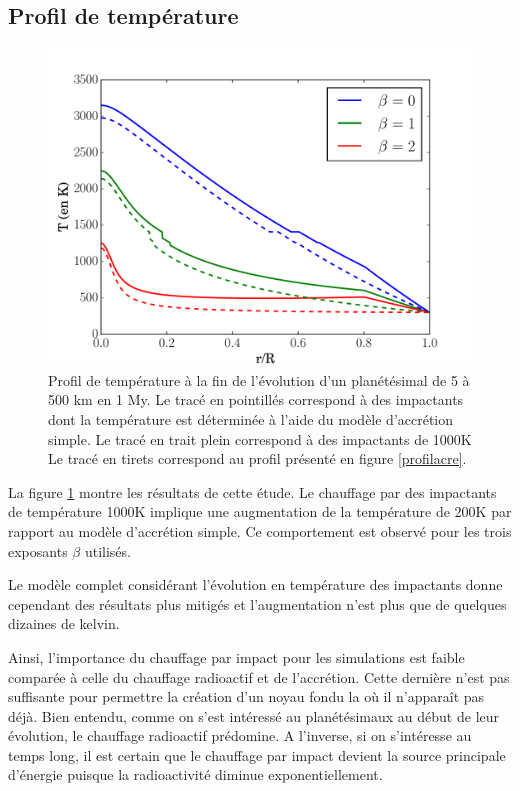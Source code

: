 \documentclass[10pt,a4paper]{article}
\numberwithin{equation}{section}
\begin{document}
\label{impactant}
\subsection{Profil de température}

\begin{figure}[h]
    \centering	    
	\includegraphics[scale=0.45]{figures/profil_acre_impact.pdf}
    \caption{Profil de température à la fin de l'évolution d'un planétésimal de 5 à 500 km en 1 My. Le tracé en pointillés correspond à des impactants dont la température est déterminée à l'aide du modèle d'accrétion simple. Le tracé en trait plein correspond à des impactants de 1000K Le tracé en tirets correspond au profil présenté en figure \ref{profilacre}.}
    	\label{impact} 
\end{figure}

La figure \ref{impact} montre les résultats de cette étude. Le chauffage par des impactants de température 1000K implique une augmentation de la température de 200K par rapport au modèle d'accrétion simple. Ce comportement est observé pour les trois exposants $\beta$ utilisés.
\medskip

Le modèle complet considérant l'évolution en température des impactants donne cependant des résultats plus mitigés et l'augmentation n'est plus que de quelques dizaines de kelvin.
\medskip

Ainsi, l'importance du chauffage par impact pour les simulations est faible comparée à celle du chauffage radioactif et de l'accrétion. Cette dernière n'est pas suffisante pour permettre la création d'un noyau fondu la où il n'apparaît pas déjà. Bien entendu, comme on s'est intéressé au planétésimaux au début de leur évolution, le chauffage radioactif prédomine. A l'inverse, si on s'intéresse au temps long, il est certain que le chauffage par impact devient la source principale d'énergie puisque la radioactivité diminue exponentiellement. 
\end{document}
